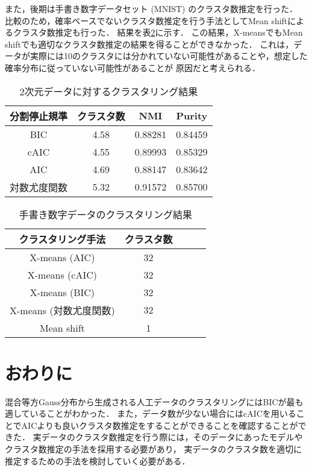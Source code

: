 \documentclass[twocolumn, 10.5pt,a4j]{ltjsarticle}
\def\tableref#1{表\ref{#1}}
\begin{document}
また，後期は手書き数字データセット (MNIST) のクラスタ数推定を行った．
比較のため，確率ベースでないクラスタ数推定を行う手法としてMean shiftによるクラスタ数推定も行った．
結果を\tableref{table:mnist}に示す．
この結果，X-meansでもMean shiftでも適切なクラスタ数推定の結果を得ることができなかった．
これは，データが実際には10のクラスタには分かれていない可能性があることや，想定した確率分布に従っていない可能性があることが
原因だと考えられる．

\begin{table}[htb]
  \centering
  \caption{2次元データに対するクラスタリング結果}
  \label{table:2dim}
  \begin{tabular}{|c|c|c|c|} \hline
    分割停止規準 & クラスタ数 & NMI & Purity \\\hline
    BIC  & 4.58 & 0.88281 & 0.84459\\
    cAIC & 4.55 & 0.89993 & 0.85329\\
    AIC  & 4.69 & 0.88147 & 0.83642\\
    対数尤度関数 & 5.32 & 0.91572 & 0.85700\\\hline
  \end{tabular}
\end{table}

\begin{table}[htb]
  \centering
  \caption{手書き数字データのクラスタリング結果}
  \label{table:mnist}
  \begin{tabular}{|c|c|c|c|c|} \hline
    クラスタリング手法 & クラスタ数\\\hline
    X-means (AIC) & 32\\
    X-means (cAIC) & 32\\
    X-means (BIC) & 32\\
    X-means (対数尤度関数)& 32\\
    Mean shift & 1\\\hline
  \end{tabular}
\end{table}

\section{おわりに}
混合等方Gauss分布から生成される人工データのクラスタリングにはBICが最も適していることがわかった．
また，データ数が少ない場合にはcAICを用いることでAICよりも良いクラスタ数推定をすることができることを確認することができた．
実データのクラスタ数推定を行う際には，そのデータにあったモデルやクラスタ数推定の手法を採用する必要があり，
実データのクラスタ数を適切に推定するための手法を検討していく必要がある．
\end{document}
